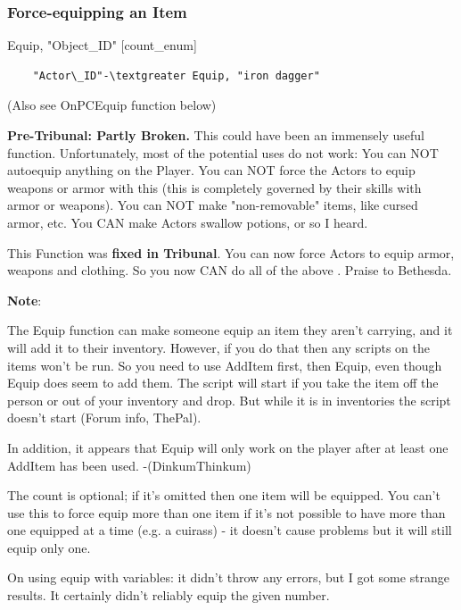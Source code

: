 \hypertarget{force-equipping-an-item}{%
\subsubsection{\texorpdfstring{\hfill\break
Force-equipping an Item
}{ Force-equipping an Item }}\label{force-equipping-an-item}}

Equip, "Object\_ID" {[}count\_enum{]}

\begin{lstlisting}
	"Actor\_ID"-\textgreater Equip, "iron dagger"
\end{lstlisting}

(Also see OnPCEquip function below)

\textbf{Pre-Tribunal: Partly Broken.} This could have been an immensely
useful function. Unfortunately, most of the potential uses do not work:
You can NOT autoequip anything on the Player. You can NOT force the
Actors to equip weapons or armor with this (this is completely governed
by their skills with armor or weapons). You can NOT make "non-removable"
items, like cursed armor, etc. You CAN make Actors swallow potions, or
so I heard.

This Function was \textbf{fixed in Tribunal}. You can now force Actors
to equip armor, weapons and clothing. So you now CAN do all of the above
. Praise to Bethesda.

\textbf{Note}:

The Equip function can make someone equip an item they aren't carrying,
and it will add it to their inventory. However, if you do that then any
scripts on the items won't be run. So you need to use AddItem first,
then Equip, even though Equip does seem to add them. The script will
start if you take the item off the person or out of your inventory and
drop. But while it is in inventories the script doesn't start (Forum
info, ThePal).

In addition, it appears that Equip will only work on the player after at
least one AddItem has been used. -(DinkumThinkum)

The count is optional; if it's omitted then one item will be equipped.
You can't use this to force equip more than one item if it's not
possible to have more than one equipped at a time (e.g. a cuirass) - it
doesn't cause problems but it will still equip only one.

On using equip with variables: it didn't throw any errors, but I got
some strange results. It certainly didn't reliably equip the given
number.

